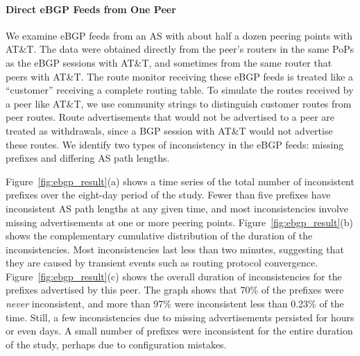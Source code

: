 \paragraph{Direct eBGP Feeds from One Peer} \label{subsec:ebgpResult}

We examine eBGP feeds from an AS with about half a dozen peering
points with AT\&T.  The data were obtained directly from the peer's
routers in the same PoPs as the eBGP sessions with AT\&T, and sometimes
from the same router that peers with AT\&T.  The route monitor
receiving these eBGP feeds is treated like a ``customer'' receiving a
complete routing table. To simulate the routes received by a peer like
AT\&T, we use community strings to distinguish customer routes from
peer routes.  Route advertisements that would not be advertised to a
peer are treated as withdrawals, since a BGP session with AT\&T would
not advertise these routes.
We identify two types of inconsistency in the eBGP feeds: missing
prefixes and differing AS path lengths.

Figure~\ref{fig:ebgp_result}(a) shows a time series of the total
number of inconsistent prefixes over the eight-day period of the
study. Fewer than five prefixes have inconsistent AS path lengths at
any given time, and most inconsistencies involve missing advertisements at
one or more peering points.
Figure~\ref{fig:ebgp_result}(b) shows the complementary cumulative
distribution of the duration of the inconsistencies.  Most
inconsistencies last less than two minutes, suggesting that they are
caused by transient events such as routing protocol convergence.
Figure~\ref{fig:ebgp_result}(c) shows the overall duration of
inconsistencies for the prefixes advertised by this peer. The graph
shows that 70\% of the prefixes were {\em never\/} inconsistent, and
more than 97\% were inconsistent less than 0.23\% of the time.  Still,
a few inconsistencies due to missing advertisements persisted for
hours or even days.  A small number of prefixes were inconsistent for
the entire duration of the study, perhaps due to configuration
mistakes.
%


